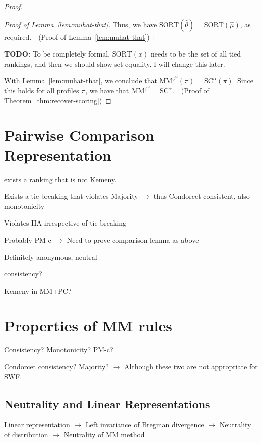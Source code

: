 \documentclass[10pt,letterpaper]{article}
\newcommand{\scr}{{\text{SC}}}
\newcommand{\mm}{\text{MM}}
\newcommand{\sca}{{\scr^{\alpha}}}
\newcommand{\sort}{\text{SORT}}
\newcommand{\phia}{\phi^{\alpha}}
\newcommand{\mmphia}{\mm^{\phia}}
\newcommand{\muhat}{\hat{\mu}}
\newcommand{\that}{\hat{\theta}}
\begin{document}
\begin{proof}
\begin{proof}[Proof of Lemma~\ref{lem:muhat-that}]
Thus, we have $\sort(\that) = \sort(\muhat)$, as required.~\qedhere~(Proof of Lemma~\ref{lem:muhat-that})
\end{proof}

{\bf TODO:} To be completely formal, $\sort(x)$ needs to be the set of all tied rankings, and then we should show set equality. I will change this later.

With Lemma~\ref{lem:muhat-that}, we conclude that $\mmphia(\pi) = \sca(\pi)$. Since this holds for all profiles $\pi$, we have that $\mmphia = \sca$.~\qedhere~(Proof of Theorem~\ref{thm:recover-scoring})
\end{proof}


\section{Pairwise Comparison Representation}
\label{sec:pc}

exists a ranking that is not Kemeny. 

Exists a tie-breaking that violates Majority $\rightarrow$ thus Condorcet consistent, also monotonicity

Violates IIA irrespective of tie-breaking

Probably PM-c $\rightarrow$ Need to prove comparison lemma as above

Definitely anonymous, neutral

consistency? 

Kemeny in MM+PC?


\section{Properties of MM rules}
\label{sec:properties}

Consistency? Monotonicity? PM-c? 

Condorcet consistency? Majority? $\rightarrow$ Although these two are not appropriate for SWF.

\subsection{Neutrality and Linear Representations}

Linear representation $\rightarrow$ Left invariance of Bregman divergence $\rightarrow$ Neutrality of distribution $\rightarrow$ Neutrality of MM method

\end{document}
